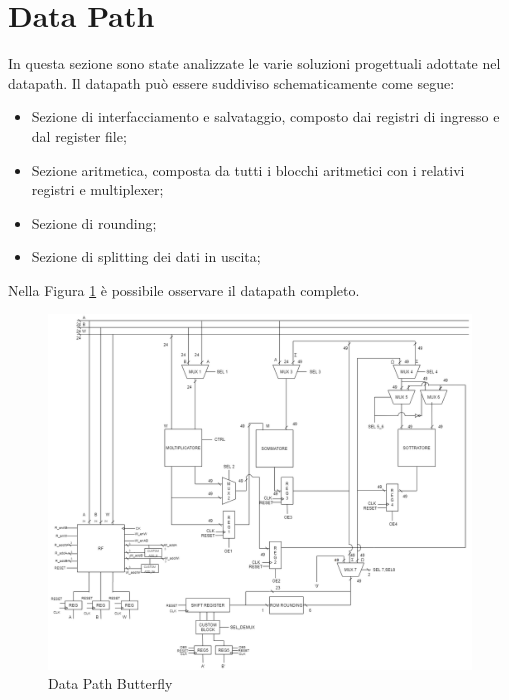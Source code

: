 \documentclass[a4paper, titlepage]{article}
\begin{document}
\section{Data Path}%
In questa sezione sono state analizzate le varie soluzioni progettuali adottate nel datapath.
Il datapath può essere suddiviso schematicamente come segue:
\begin{itemize}
    \item Sezione di interfacciamento e salvataggio, composto dai registri di ingresso e dal register file;
    \item Sezione aritmetica, composta da tutti i blocchi aritmetici con i relativi registri e multiplexer;
    \item Sezione di rounding;
    \item Sezione di splitting dei dati in uscita;
\end{itemize}
Nella Figura \ref{fig:datapath} è possibile osservare il datapath completo.
\begin{figure}[h]
   \centering
    \includegraphics[scale=0.5]{DATAPATHULTIMAVERSIONE .png}
    \caption{Data Path Butterfly}
    \label{fig:datapath}
\end{figure}
\newpage
\end{document}
